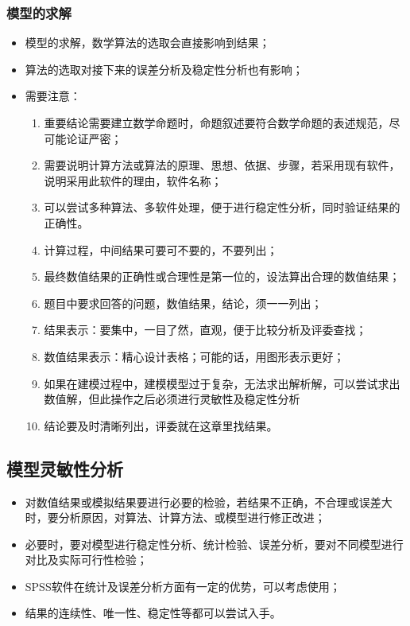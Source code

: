 \documentclass[openany]{progbookcn}
\begin{document}
\subsubsection{模型的求解}
\begin{itemize}
    \item 模型的求解，数学算法的选取会直接影响到结果；
    \item 算法的选取对接下来的误差分析及稳定性分析也有影响；
    \item 需要注意：
    \begin{enumerate}[itemindent=1em]
        \item 重要结论需要建立数学命题时，命题叙述要符合数学命题的表述规范，尽可能论证严密；
        \item 需要说明计算方法或算法的原理、思想、依据、步骤，若采用现有软件，说明采用此软件的理由，软件名称；
        \item 可以尝试多种算法、多软件处理，便于进行稳定性分析，同时验证结果的正确性。
        \item 计算过程，中间结果可要可不要的，不要列出；
        \item 最终数值结果的正确性或合理性是第一位的，设法算出合理的数值结果；
        \item 题目中要求回答的问题，数值结果，结论，须一一列出；
        \item 结果表示：要集中，一目了然，直观，便于比较分析及评委查找；
        \item 数值结果表示：精心设计表格；可能的话，用图形表示更好；
        \item 如果在建模过程中，建模模型过于复杂，无法求出解析解，可以尝试求出数值解，但此操作之后必须进行灵敏性及稳定性分析
        \item 结论要及时清晰列出，评委就在这章里找结果。
    \end{enumerate}
\end{itemize}
\subsection{模型灵敏性分析}
\begin{itemize}
    \item 对数值结果或模拟结果要进行必要的检验，若结果不正确，不合理或误差大时，要分析原因，对算法、计算方法、或模型进行修正改进；
    \item 必要时，要对模型进行稳定性分析、统计检验、误差分析，要对不同模型进行对比及实际可行性检验；
    \item SPSS软件在统计及误差分析方面有一定的优势，可以考虑使用；
    \item 结果的连续性、唯一性、稳定性等都可以尝试入手。
\end{itemize}
\end{document}
